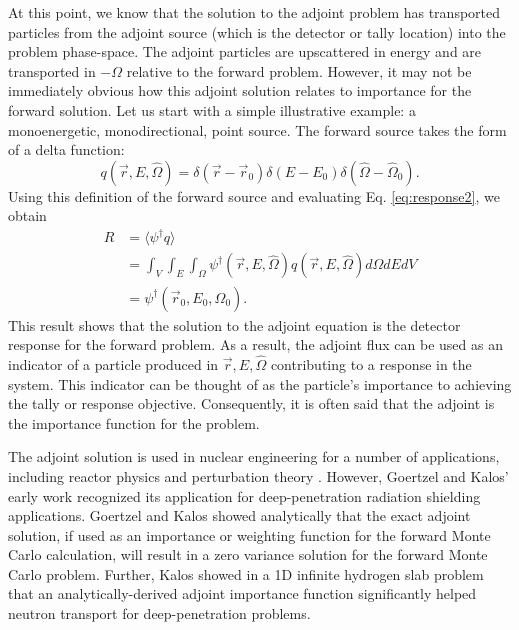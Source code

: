 At this point, we know that the solution to the adjoint problem has
transported particles from the adjoint source (which is the detector or tally
location) into the problem phase-space. The adjoint particles are
upscattered in energy and are transported in $-\Omega$ relative to the forward
problem. However, it may not be immediately obvious how this adjoint solution
relates to importance for the forward solution. Let us start with a simple
illustrative example: a monoenergetic, monodirectional, point source. The
forward source takes the form of a delta function:
\begin{equation*}
  q(\vec{r}, E, \hat{\Omega}) = \delta(\vec{r}-\vec{r}_0) \delta(E-E_0)
  \delta(\hat{\Omega}-\hat{\Omega}_0) .
\end{equation*}
Using this definition of the forward source and evaluating Eq.
\eqref{eq:response2}, we obtain
\begin{equation*}
  \begin{split}
    R &= \langle \psi^{\dagger} q \rangle \\
    &= \int_{V} \int_{E} \int_{\Omega} \psi^{\dagger}(\vec{r}, E, \hat{\Omega})
       q(\vec{r}, E, \hat{\Omega}) d\Omega dE dV \\
       & = \psi^{\dagger}(\vec{r}_0, E_0, \hat{\Omega}_0).
\end{split}
\end{equation*}
This result shows that the solution to the adjoint equation is the detector
response for the forward problem. As a result, the adjoint flux can be used as
an indicator of a particle produced in $\vec{r}, E, \hat{\Omega}$ contributing
to a response in the system. This indicator can be thought of as the particle's
importance to achieving the tally or response objective. Consequently, it is
often said that the adjoint is the importance function for the problem.

The adjoint solution is used in nuclear engineering for a number of
applications, including reactor physics and perturbation theory
\cite{lewins_importance_1965, lewins_developments_1968,
greenspan_developments_1976, lux_monte_1991}.
However, Goertzel and Kalos' early work recognized its
application for deep-penetration radiation shielding applications.
Goertzel and Kalos \cite{goertzel_monte_1958}
showed analytically
that the exact adjoint solution, if used as an importance or weighting
function for the forward Monte Carlo calculation, will result in a zero variance
solution for the forward Monte Carlo problem. Further, Kalos
\cite{kalos_importance_1963} showed in a 1D infinite hydrogen slab problem that
an analytically-derived adjoint importance function significantly helped neutron
transport for deep-penetration problems.

